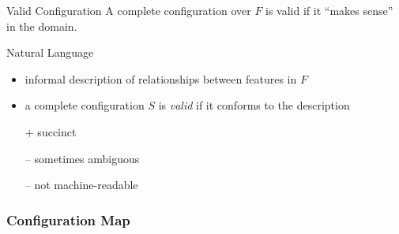 \begin{frame}{\myframetitle}\label{frame:natlang}
	\begin{fancycolumns}
		\begin{note}{Valid Configuration}
			A complete configuration over $F$ is valid if it ``makes sense'' in the domain.
			\emph{\color{red}{$\leadsto$ ``makes sense''?}}
		\end{note}

		\begin{definition}{Natural Language}
			\begin{itemize}
				\item informal description of relationships between features in $F$
				\item a complete configuration $S$ is \emph{valid} if it conforms to the description
				\item[+] succinct
				\item[--] sometimes ambiguous
				\item[--] not machine-readable
			\end{itemize}
		\end{definition}
	\nextcolumn
	\end{fancycolumns}
\end{frame}

\subsubsection{Configuration Map}

